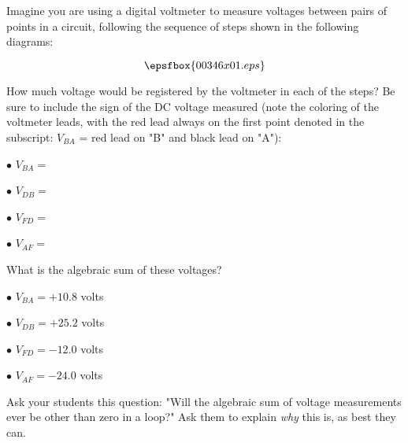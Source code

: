 

Imagine you are using a digital voltmeter to measure voltages between pairs of points in a circuit, following the sequence of steps shown in the following diagrams:

$$\epsfbox{00346x01.eps}$$

How much voltage would be registered by the voltmeter in each of the steps?  Be sure to include the sign of the DC voltage measured (note the coloring of the voltmeter leads, with the red lead always on the first point denoted in the subscript: $V_{BA}$ = red lead on "B" and black lead on "A"):

\medskip
\item{$\bullet$} $V_{BA} = $
\item{$\bullet$} $V_{DB} = $
\item{$\bullet$} $V_{FD} = $
\item{$\bullet$} $V_{AF} = $
\medskip

What is the algebraic sum of these voltages?







\medskip
\item{$\bullet$} $V_{BA} = +10.8$ volts
\item{$\bullet$} $V_{DB} = +25.2$ volts
\item{$\bullet$} $V_{FD} = -12.0$ volts
\item{$\bullet$} $V_{AF} = -24.0$ volts
\medskip







Ask your students this question: "Will the algebraic sum of voltage measurements ever be other than zero in a loop?"  Ask them to explain {\it why} this is, as best they can.




